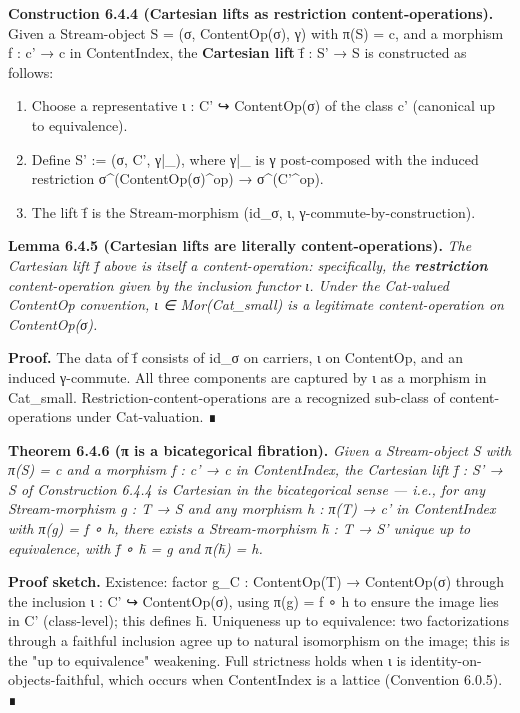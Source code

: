 \documentclass[11pt, openany]{book}
\begin{document}
\textbf{Construction 6.4.4 (Cartesian lifts as restriction content-operations).} Given a Stream-object S = (σ, ContentOp(σ), γ) with π(S) = c, and a morphism f : c' → c in ContentIndex, the \textbf{Cartesian lift} f̄ : S' → S is constructed as follows:

\begin{enumerate}
\item Choose a representative ι : C' ↪ ContentOp(σ) of the class c' (canonical up to equivalence).
\item Define S' := (σ, C', γ|\_), where γ|\_ is γ post-composed with the induced restriction σ\textasciicircum{}(ContentOp(σ)\textasciicircum{}op) → σ\textasciicircum{}(C'\textasciicircum{}op).
\item The lift f̄ is the Stream-morphism (id\_\allowbreak{}σ, ι, γ-commute-by-construction).
\end{enumerate}

\textbf{Lemma 6.4.5 (Cartesian lifts are literally content-operations).} \textit{The Cartesian lift f̄ above is itself a content-operation: specifically, the \textbf{restriction} content-operation given by the inclusion functor ι. Under the Cat-valued ContentOp convention, ι ∈ Mor(Cat\_\allowbreak{}small) is a legitimate content-operation on ContentOp(σ).}

\textbf{Proof.} The data of f̄ consists of id\_\allowbreak{}σ on carriers, ι on ContentOp, and an induced γ-commute. All three components are captured by ι as a morphism in Cat\_\allowbreak{}small. Restriction-content-operations are a recognized sub-class of content-operations under Cat-valuation. ∎

\textbf{Theorem 6.4.6 (π is a bicategorical fibration).} \textit{Given a Stream-object S with π(S) = c and a morphism f : c' → c in ContentIndex, the Cartesian lift f̄ : S' → S of Construction 6.4.4 is Cartesian in the bicategorical sense --- i.e., for any Stream-morphism g : T → S and any morphism h : π(T) → c' in ContentIndex with π(g) = f ∘ h, there exists a Stream-morphism h̄ : T → S' unique up to equivalence, with f̄ ∘ h̄ = g and π(h̄) = h.}

\textbf{Proof sketch.} Existence: factor g\_\allowbreak{}C : ContentOp(T) → ContentOp(σ) through the inclusion ι : C' ↪ ContentOp(σ), using π(g) = f ∘ h to ensure the image lies in C' (class-level); this defines h̄. Uniqueness up to equivalence: two factorizations through a faithful inclusion agree up to natural isomorphism on the image; this is the "up to equivalence" weakening. Full strictness holds when ι is identity-on-objects-faithful, which occurs when ContentIndex is a lattice (Convention 6.0.5). ∎
\end{document}

